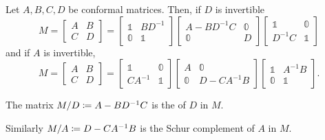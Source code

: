 \begin{lemma} \label{schurComplementLemma}
Let $A,B,C,D$ be conformal matrices. Then, if $D$ is invertible 
\[ M = \begin{bmatrix}
A & B \\ C & D
\end{bmatrix} = \begin{bmatrix}
\mathbb{1} & BD^{-1} \\ \mathbb{0} & \mathbb{1}
\end{bmatrix}\begin{bmatrix}
A-BD^{-1}C & \mathbb{0} \\ \mathbb{0} & D
\end{bmatrix}\begin{bmatrix}
\mathbb{1} & \mathbb{0} \\ D^{-1}C & \mathbb{1}
\end{bmatrix}  \]
and if $A$ is invertible,
\[ M = \begin{bmatrix}
A & B \\ C & D
\end{bmatrix} = \begin{bmatrix}
\mathbb{1} & \mathbb{0} \\ CA^{-1} & \mathbb{1}
\end{bmatrix}\begin{bmatrix}
A & \mathbb{0} \\ \mathbb{0} & D - CA^{-1}B
\end{bmatrix}\begin{bmatrix}
\mathbb{1} & A^{-1}B \\ \mathbb{0} & \mathbb{1}
\end{bmatrix}.  \]
\end{lemma}
\begin{definition}
The matrix $M/D \coloneqq A-BD^{-1}C$ is the  of $D$ in $M$.

Similarly $M/A \coloneqq D-CA^{-1}B$ is the Schur complement of $A$ in $M$.
\end{definition}

